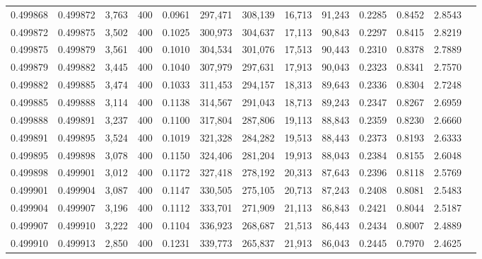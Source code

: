\begin{tabular}{rrrrrrrrrrrrr}
0.499868 & 0.499872 &  3,763 & 400 &                                     0.0961 & 297,471 & 308,139 &  16,713 &  91,243 & 0.2285 & 0.8452 & 2.8543 \\
0.499872 & 0.499875 &  3,502 & 400 &                                     0.1025 & 300,973 & 304,637 &  17,113 &  90,843 & 0.2297 & 0.8415 & 2.8219 \\
0.499875 & 0.499879 &  3,561 & 400 &                                     0.1010 & 304,534 & 301,076 &  17,513 &  90,443 & 0.2310 & 0.8378 & 2.7889 \\
0.499879 & 0.499882 &  3,445 & 400 &                                     0.1040 & 307,979 & 297,631 &  17,913 &  90,043 & 0.2323 & 0.8341 & 2.7570 \\
0.499882 & 0.499885 &  3,474 & 400 &                                     0.1033 & 311,453 & 294,157 &  18,313 &  89,643 & 0.2336 & 0.8304 & 2.7248 \\
0.499885 & 0.499888 &  3,114 & 400 &                                     0.1138 & 314,567 & 291,043 &  18,713 &  89,243 & 0.2347 & 0.8267 & 2.6959 \\
0.499888 & 0.499891 &  3,237 & 400 &                                     0.1100 & 317,804 & 287,806 &  19,113 &  88,843 & 0.2359 & 0.8230 & 2.6660 \\
0.499891 & 0.499895 &  3,524 & 400 &                                     0.1019 & 321,328 & 284,282 &  19,513 &  88,443 & 0.2373 & 0.8193 & 2.6333 \\
0.499895 & 0.499898 &  3,078 & 400 &                                     0.1150 & 324,406 & 281,204 &  19,913 &  88,043 & 0.2384 & 0.8155 & 2.6048 \\
0.499898 & 0.499901 &  3,012 & 400 &                                     0.1172 & 327,418 & 278,192 &  20,313 &  87,643 & 0.2396 & 0.8118 & 2.5769 \\
0.499901 & 0.499904 &  3,087 & 400 &                                     0.1147 & 330,505 & 275,105 &  20,713 &  87,243 & 0.2408 & 0.8081 & 2.5483 \\
0.499904 & 0.499907 &  3,196 & 400 &                                     0.1112 & 333,701 & 271,909 &  21,113 &  86,843 & 0.2421 & 0.8044 & 2.5187 \\
0.499907 & 0.499910 &  3,222 & 400 &                                     0.1104 & 336,923 & 268,687 &  21,513 &  86,443 & 0.2434 & 0.8007 & 2.4889 \\
0.499910 & 0.499913 &  2,850 & 400 &                                     0.1231 & 339,773 & 265,837 &  21,913 &  86,043 & 0.2445 & 0.7970 & 2.4625 \\

\end{tabular}
